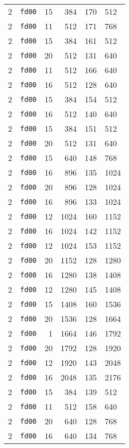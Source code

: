 \documentclass{article}
\begin{document}
\begin{table}[h!]
\begin{tabular}{llrrrl}
    2 & \texttt{fd00} & 15 & 384 & 170 & 512 \\
    2 & \texttt{fd00} & 11 & 512 & 171 & 768 \\
    2 & \texttt{fd00} & 15 & 384 & 161 & 512 \\
    2 & \texttt{fd00} & 20 & 512 & 131 & 640 \\
    2 & \texttt{fd00} & 11 & 512 & 166 & 640 \\
    2 & \texttt{fd00} & 16 & 512 & 128 & 640 \\
    2 & \texttt{fd00} & 15 & 384 & 154 & 512 \\
    2 & \texttt{fd00} & 16 & 512 & 140 & 640 \\
    2 & \texttt{fd00} & 15 & 384 & 151 & 512 \\
    2 & \texttt{fd00} & 20 & 512 & 131 & 640 \\
    2 & \texttt{fd00} & 15 & 640 & 148 & 768 \\
    2 & \texttt{fd00} & 16 & 896 & 135 & 1024 \\
    2 & \texttt{fd00} & 20 & 896 & 128 & 1024 \\
    2 & \texttt{fd00} & 16 & 896 & 133 & 1024 \\
    2 & \texttt{fd00} & 12 & 1024 & 160 & 1152 \\
    2 & \texttt{fd00} & 16 & 1024 & 142 & 1152 \\
    2 & \texttt{fd00} & 12 & 1024 & 153 & 1152 \\
    2 & \texttt{fd00} & 20 & 1152 & 128 & 1280 \\
    2 & \texttt{fd00} & 16 & 1280 & 138 & 1408 \\
    2 & \texttt{fd00} & 12 & 1280 & 145 & 1408 \\
    2 & \texttt{fd00} & 15 & 1408 & 160 & 1536 \\
    2 & \texttt{fd00} & 20 & 1536 & 128 & 1664 \\
    2 & \texttt{fd00} & 1 & 1664 & 146 & 1792 \\
    2 & \texttt{fd00} & 20 & 1792 & 128 & 1920 \\
    2 & \texttt{fd00} & 12 & 1920 & 143 & 2048 \\
    2 & \texttt{fd00} & 16 & 2048 & 135 & 2176 \\
    2 & \texttt{fd00} & 15 & 384 & 139 & 512 \\
    2 & \texttt{fd00} & 11 & 512 & 158 & 640 \\
    2 & \texttt{fd00} & 20 & 640 & 128 & 768 \\
    2 & \texttt{fd00} & 16 & 640 & 134 & 768 \\

\end{tabular}
\end{table}
\end{document}
